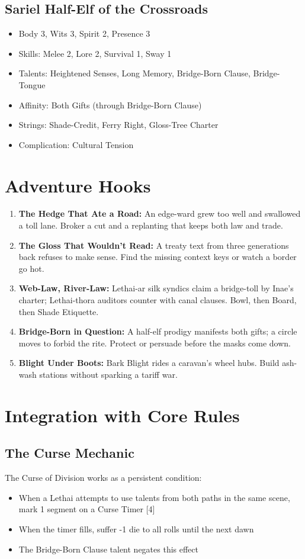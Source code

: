 \documentclass[11pt]{article}
\begin{document}
\subsection*{Sariel Half-Elf of the Crossroads}
\begin{itemize}
  \item Body 3, Wits 3, Spirit 2, Presence 3
  \item Skills: Melee 2, Lore 2, Survival 1, Sway 1
  \item Talents: Heightened Senses, Long Memory, Bridge-Born Clause, Bridge-Tongue
  \item Affinity: Both Gifts (through Bridge-Born Clause)
  \item Strings: Shade-Credit, Ferry Right, Gloss-Tree Charter
  \item Complication: Cultural Tension
\end{itemize}

\section*{Adventure Hooks}
\begin{enumerate}
  \item \textbf{The Hedge That Ate a Road:} An edge-ward grew too well and swallowed a toll lane. Broker a cut and a replanting that keeps both law and trade.
  \item \textbf{The Gloss That Wouldn't Read:} A treaty text from three generations back refuses to make sense. Find the missing context keys or watch a border go hot.
  \item \textbf{Web-Law, River-Law:} Lethai-ar silk syndics claim a bridge-toll by Inae's charter; Lethai-thora auditors counter with canal clauses. Bowl, then Board, then Shade Etiquette.
  \item \textbf{Bridge-Born in Question:} A half-elf prodigy manifests both gifts; a circle moves to forbid the rite. Protect or persuade before the masks come down.
  \item \textbf{Blight Under Boots:} Bark Blight rides a caravan's wheel hubs. Build ash-wash stations without sparking a tariff war.
\end{enumerate}

\section*{Integration with Core Rules}

\subsection*{The Curse Mechanic}
The Curse of Division works as a persistent condition:
\begin{itemize}
  \item When a Lethai attempts to use talents from both paths in the same scene, mark 1 segment on a Curse Timer [4]
  \item When the timer fills, suffer -1 die to all rolls until the next dawn
  \item The Bridge-Born Clause talent negates this effect
\end{itemize}
\end{document}
